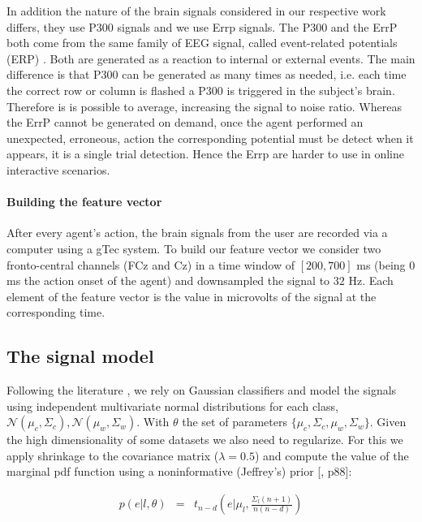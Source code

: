 In addition the nature of the brain signals considered in our respective work differs, they use P300 signals and we use Errp signals. The P300 and the ErrP both come from the same family of EEG signal, called event-related potentials (ERP) \cite{chavarriaga2014errare}. Both are generated as a reaction to internal or external events. The main difference is that P300 can be generated as many times as needed, i.e. each time the correct row or column is flashed a P300 is triggered in the subject's brain. Therefore is is possible to average, increasing the signal to noise ratio. Whereas the ErrP cannot be generated on demand, once the agent performed an unexpected, erroneous, action the corresponding potential must be detect when it appears, it is a single trial detection. Hence the Errp are harder to use in online interactive scenarios.

\paragraph{Building the feature vector} After every agent's action, the brain signals from the user are recorded via a computer using a gTec system. To build our feature vector we consider two fronto-central channels (FCz and Cz) in a time window of $[200,700]$ ms (being 0 ms the action onset of the agent) and downsampled the signal to $32$ Hz. Each element of the feature vector is the value in microvolts of the signal at the corresponding time. 

\subsection{The signal model}

Following the literature \cite{lotte2007review,blankertz2010single}, we rely on Gaussian classifiers and model the signals using independent multivariate normal distributions for each class, $\mathcal{N}(\mu_c, \Sigma_c), \mathcal{N}(\mu_w, \Sigma_w)$. With $\theta$ the set of parameters $\{\mu_c, \Sigma_c,\mu_w, \Sigma_w\}$. Given the high dimensionality of some datasets we also need to regularize. For this we apply shrinkage to the covariance matrix ($\lambda = 0.5$) and compute the value of the marginal pdf function using a noninformative (Jeffrey's) prior [\cite{gelman2003bayesian}, p88]:

\begin{eqnarray}
p(e|l, \theta) & = & t_{n-d}(e | \mu_l,\frac{\Sigma_l (n+1)}{n(n-d)})
\end{eqnarray}

